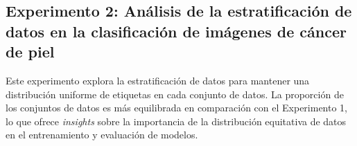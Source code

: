 \subsection{Experimento 2: Análisis de la estratificación de datos en la clasificación de imágenes de cáncer de piel}

Este experimento explora la estratificación de datos para mantener una distribución uniforme de etiquetas en cada conjunto de datos. La proporción de los conjuntos de datos es más equilibrada en comparación con el Experimento 1, lo que ofrece \textit{insights} sobre la importancia de la distribución equitativa de datos en el entrenamiento y evaluación de modelos.